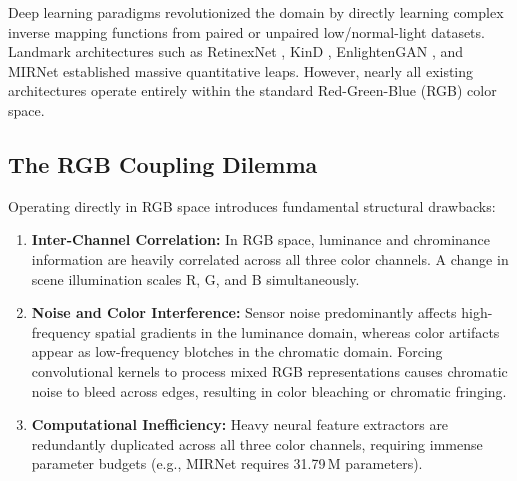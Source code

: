 \documentclass[10pt,twocolumn,letterpaper]{article}
\begin{document}
Deep learning paradigms revolutionized the domain by directly learning complex inverse mapping functions from paired or unpaired low/normal-light datasets. Landmark architectures such as RetinexNet \cite{wei2018deep}, KinD \cite{zhang2019kindling}, EnlightenGAN \cite{jiang2021enlightengan}, and MIRNet \cite{zamir2020learning} established massive quantitative leaps. However, nearly all existing architectures operate entirely within the standard Red-Green-Blue (RGB) color space.

\subsection{The RGB Coupling Dilemma}
Operating directly in RGB space introduces fundamental structural drawbacks:
\begin{enumerate}
    \item \textbf{Inter-Channel Correlation:} In RGB space, luminance and chrominance information are heavily correlated across all three color channels. A change in scene illumination scales R, G, and B simultaneously.
    \item \textbf{Noise and Color Interference:} Sensor noise predominantly affects high-frequency spatial gradients in the luminance domain, whereas color artifacts appear as low-frequency blotches in the chromatic domain. Forcing convolutional kernels to process mixed RGB representations causes chromatic noise to bleed across edges, resulting in color bleaching or chromatic fringing.
    \item \textbf{Computational Inefficiency:} Heavy neural feature extractors are redundantly duplicated across all three color channels, requiring immense parameter budgets (e.g., MIRNet requires 31.79\,M parameters).
\end{enumerate}
\end{document}
